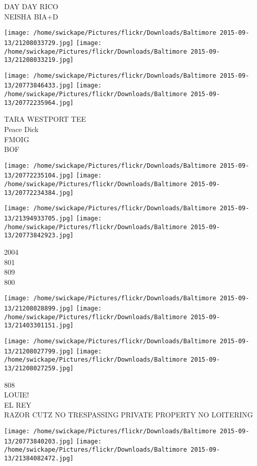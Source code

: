 \documentclass[10pt,letterpaper]{article}
\begin{document}
DAY DAY RICO\\
NEISHA BIA+D\\
\pagebreak

\texttt{[image: /home/swickape/Pictures/flickr/Downloads/Baltimore 2015-09-13/21208033729.jpg]}
\texttt{[image: /home/swickape/Pictures/flickr/Downloads/Baltimore 2015-09-13/21208033219.jpg]}

\texttt{[image: /home/swickape/Pictures/flickr/Downloads/Baltimore 2015-09-13/20773846433.jpg]}
\texttt{[image: /home/swickape/Pictures/flickr/Downloads/Baltimore 2015-09-13/20772235964.jpg]}

TARA WESTPORT TEE\\
Peace Dick\\
FMOIG\\
BOF\\
\pagebreak

\texttt{[image: /home/swickape/Pictures/flickr/Downloads/Baltimore 2015-09-13/20772235104.jpg]}
\texttt{[image: /home/swickape/Pictures/flickr/Downloads/Baltimore 2015-09-13/20772234384.jpg]}

\texttt{[image: /home/swickape/Pictures/flickr/Downloads/Baltimore 2015-09-13/21394933705.jpg]}
\texttt{[image: /home/swickape/Pictures/flickr/Downloads/Baltimore 2015-09-13/20773842923.jpg]}

2004\\
801\\
809\\
800\\
\pagebreak

\texttt{[image: /home/swickape/Pictures/flickr/Downloads/Baltimore 2015-09-13/21208028899.jpg]}
\texttt{[image: /home/swickape/Pictures/flickr/Downloads/Baltimore 2015-09-13/21403301151.jpg]}

\texttt{[image: /home/swickape/Pictures/flickr/Downloads/Baltimore 2015-09-13/21208027799.jpg]}
\texttt{[image: /home/swickape/Pictures/flickr/Downloads/Baltimore 2015-09-13/21208027259.jpg]}

808\\
LOUIE!\\
EL REY\\
RAZOR CUTZ NO TRESPASSING PRIVATE PROPERTY NO LOITERING\\
\pagebreak

\texttt{[image: /home/swickape/Pictures/flickr/Downloads/Baltimore 2015-09-13/20773840203.jpg]}
\texttt{[image: /home/swickape/Pictures/flickr/Downloads/Baltimore 2015-09-13/21384082472.jpg]}
\end{document}
